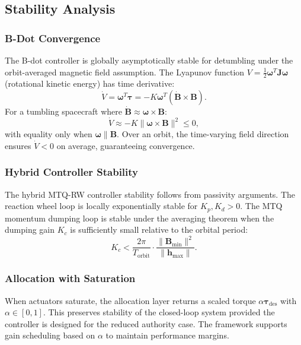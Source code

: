 \documentclass[conference]{IEEEtran}
\begin{document}
\subsection{Stability Analysis}\label{subsec:stability}

\subsubsection{B-Dot Convergence}
The B-dot controller is globally asymptotically stable for detumbling under the orbit-averaged magnetic field assumption. The Lyapunov function $V = \frac{1}{2}\boldsymbol{\omega}^T\mathbf{J}\boldsymbol{\omega}$ (rotational kinetic energy) has time derivative:
\begin{equation}
\dot{V} = \boldsymbol{\omega}^T\boldsymbol{\tau} = -K\boldsymbol{\omega}^T(\dot{\mathbf{B}} \times \mathbf{B}).
\end{equation}
For a tumbling spacecraft where $\dot{\mathbf{B}} \approx \boldsymbol{\omega} \times \mathbf{B}$:
\begin{equation}
\dot{V} \approx -K\|\boldsymbol{\omega} \times \mathbf{B}\|^2 \leq 0,
\end{equation}
with equality only when $\boldsymbol{\omega} \parallel \mathbf{B}$. Over an orbit, the time-varying field direction ensures $\dot{V} < 0$ on average, guaranteeing convergence.


\subsubsection{Hybrid Controller Stability}
The hybrid MTQ-RW controller stability follows from passivity arguments. The reaction wheel loop is locally exponentially stable for $K_p, K_d > 0$. The MTQ momentum dumping loop is stable under the averaging theorem when the dumping gain $K_c$ is sufficiently small relative to the orbital period:
\begin{equation}
K_c < \frac{2\pi}{T_{\text{orbit}}} \cdot \frac{\|\mathbf{B}_{\min}\|^2}{\|\mathbf{h}_{\max}\|}.
\end{equation}


\subsubsection{Allocation with Saturation}
When actuators saturate, the allocation layer returns a scaled torque $\alpha \boldsymbol{\tau}_{\text{des}}$ with $\alpha \in [0, 1]$. This preserves stability of the closed-loop system provided the controller is designed for the reduced authority case. The framework supports gain scheduling based on $\alpha$ to maintain performance margins.
\end{document}
